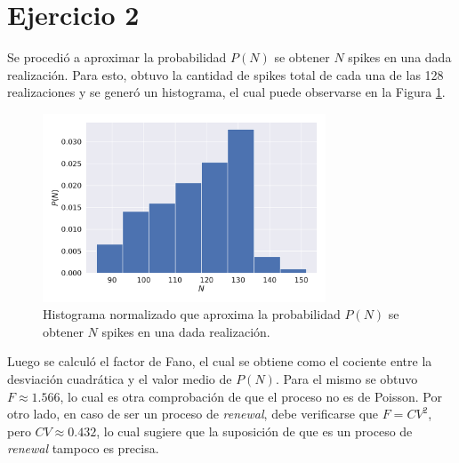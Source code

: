 \section*{Ejercicio 2}
\graphicspath{{Figuras/}}

Se procedió a aproximar la probabilidad $P(N)$ se obtener $N$ spikes en una dada realización. Para esto, obtuvo la cantidad de spikes total de cada una de las 128 realizaciones y se generó un histograma, el cual puede observarse en la Figura \ref{02:fig:Histograma}. 

\begin{figure}[h!]
    \centering
    \includegraphics[width=0.75\textwidth]{2_PN.pdf}
    \caption{Histograma normalizado que aproxima la probabilidad $P(N)$ se obtener $N$ spikes en una dada realización.}
    \label{02:fig:Histograma}
\end{figure}

Luego se calculó el factor de Fano, el cual se obtiene como el cociente entre la desviación cuadrática y el valor medio de $P(N)$. Para el mismo se obtuvo $F\approx1.566$, lo cual es otra comprobación de que el proceso no es de Poisson. Por otro lado, en caso de ser un proceso de \textit{renewal}, debe verificarse que $F=CV^{2}$, pero $CV\approx0.432$, lo cual sugiere que la suposición de que es un proceso de \textit{renewal} tampoco es precisa.
